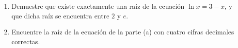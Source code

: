 \item 
    \begin{enumerate}
        \item[(a)] Demuestre que existe exactamente una raíz de la ecuación $\ln x = 3 - x$, y que dicha raíz se encuentra entre $2$ y $e$.
        \item[(b)] Encuentre la raíz de la ecuación de la parte (a) con cuatro cifras decimales correctas.
    \end{enumerate}
